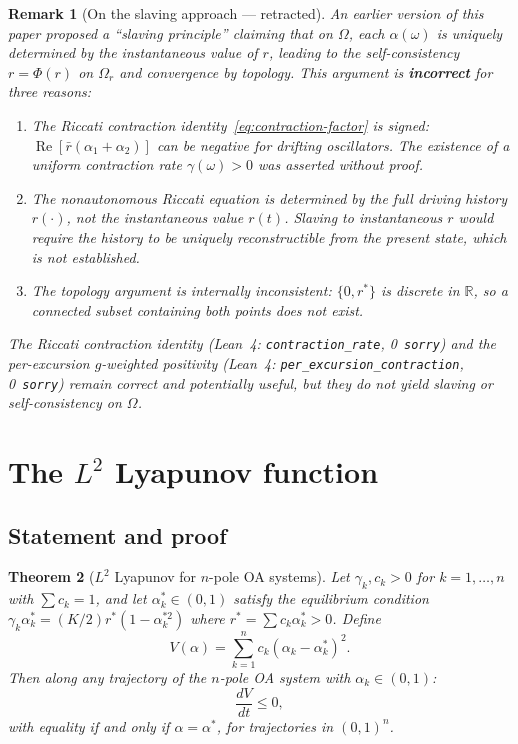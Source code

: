 \documentclass[11pt,a4paper]{article}
\newtheorem{theorem}{Theorem}[section]
\newtheorem{remark}[theorem]{Remark}
\theoremstyle{definition}
\DeclareMathOperator{\re}{Re}
\newcommand{\R}{\mathbb{R}}
\begin{document}
\begin{remark}[On the slaving approach --- retracted]\label{rem:slaving-retracted}
An earlier version of this paper proposed a ``slaving principle'' claiming that on $\Omega$, each $\alpha(\omega)$ is uniquely determined by the instantaneous value of $r$, leading to the self-consistency $r = \Phi(r)$ on $\Omega_r$ and convergence by topology. This argument is \textbf{incorrect} for three reasons:
\begin{enumerate}
\item The Riccati contraction identity~\eqref{eq:contraction-factor} is \emph{signed}: $\re[\bar{r}(\alpha_1+\alpha_2)]$ can be negative for drifting oscillators. The existence of a uniform contraction rate $\gamma(\omega) > 0$ was asserted without proof.
\item The nonautonomous Riccati equation is determined by the full driving history $r(\cdot)$, not the instantaneous value $r(t)$. Slaving to instantaneous $r$ would require the history to be uniquely reconstructible from the present state, which is not established.
\item The topology argument is internally inconsistent: $\{0, r^*\}$ is discrete in $\R$, so a connected subset containing both points does not exist.
\end{enumerate}
The Riccati contraction \emph{identity} (Lean~4: \texttt{contraction\_rate}, 0~\texttt{sorry}) and the per-excursion $g$-weighted positivity (Lean~4: \texttt{per\_excursion\_contraction}, 0~\texttt{sorry}) remain correct and potentially useful, but they do not yield slaving or self-consistency on $\Omega$.
\end{remark}

\section{The $L^2$ Lyapunov function}\label{sec:l2-lyapunov}

\subsection{Statement and proof}

\begin{theorem}[$L^2$ Lyapunov for $n$-pole OA systems]\label{thm:l2-lyapunov}
Let $\gamma_k, c_k > 0$ for $k = 1,\ldots,n$ with $\sum c_k = 1$, and let $\alpha^*_k \in (0,1)$ satisfy the equilibrium condition $\gamma_k\alpha^*_k = (K/2)r^*(1-\alpha^{*2}_k)$ where $r^* = \sum c_k\alpha^*_k > 0$. Define
\[
V(\alpha) = \sum_{k=1}^n c_k(\alpha_k - \alpha^*_k)^2.
\]
Then along any trajectory of the $n$-pole OA system with $\alpha_k \in (0,1)$:
\[
\frac{dV}{dt} \leq 0,
\]
with equality if and only if $\alpha = \alpha^*$, for trajectories in $(0,1)^n$.
\end{theorem}
\end{document}
